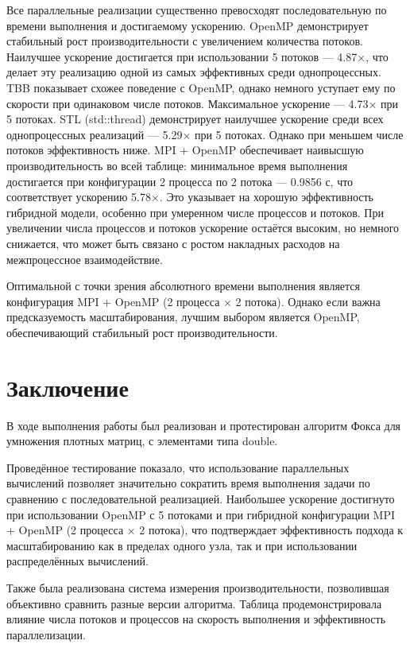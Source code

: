 \documentclass[14pt,a4paper]{extarticle}
\begin{document}
Все параллельные реализации существенно превосходят последовательную по времени выполнения и достигаемому ускорению. OpenMP демонстрирует стабильный рост производительности с увеличением количества потоков. Наилучшее ускорение достигается при использовании 5 потоков — 4.87×, что делает эту реализацию одной из самых эффективных среди однопроцессных. TBB показывает схожее поведение с OpenMP, однако немного уступает ему по скорости при одинаковом числе потоков. Максимальное ускорение — 4.73× при 5 потоках. STL (std::thread) демонстрирует наилучшее ускорение среди всех однопроцессных реализаций — 5.29× при 5 потоках. Однако при меньшем числе потоков эффективность ниже. MPI + OpenMP обеспечивает наивысшую производительность во всей таблице: минимальное время выполнения достигается при конфигурации 2 процесса по 2 потока — 0.9856 с, что соответствует ускорению 5.78×. Это указывает на хорошую эффективность гибридной модели, особенно при умеренном числе процессов и потоков.
При увеличении числа процессов и потоков ускорение остаётся высоким, но немного снижается, что может быть связано с ростом накладных расходов на межпроцессное взаимодействие.

Оптимальной с точки зрения абсолютного времени выполнения является конфигурация MPI + OpenMP (2 процесса × 2 потока).
Однако если важна предсказуемость масштабирования, лучшим выбором является OpenMP, обеспечивающий стабильный рост производительности.

\section{Заключение}

В ходе выполнения работы был реализован и протестирован алгоритм Фокса для умножения плотных матриц, с элементами типа double.

Проведённое тестирование показало, что использование параллельных вычислений позволяет значительно сократить время выполнения задачи по сравнению с последовательной реализацией. 
Наибольшее ускорение достигнуто при использовании OpenMP с 5 потоками и при гибридной конфигурации MPI + OpenMP (2 процесса × 2 потока), что подтверждает эффективность подхода к масштабированию как в пределах одного узла, так и при использовании распределённых вычислений.

Также была реализована система измерения производительности, позволившая объективно сравнить разные версии алгоритма. 
Таблица продемонстрировала влияние числа потоков и процессов на скорость выполнения и эффективность параллелизации.
\end{document}
